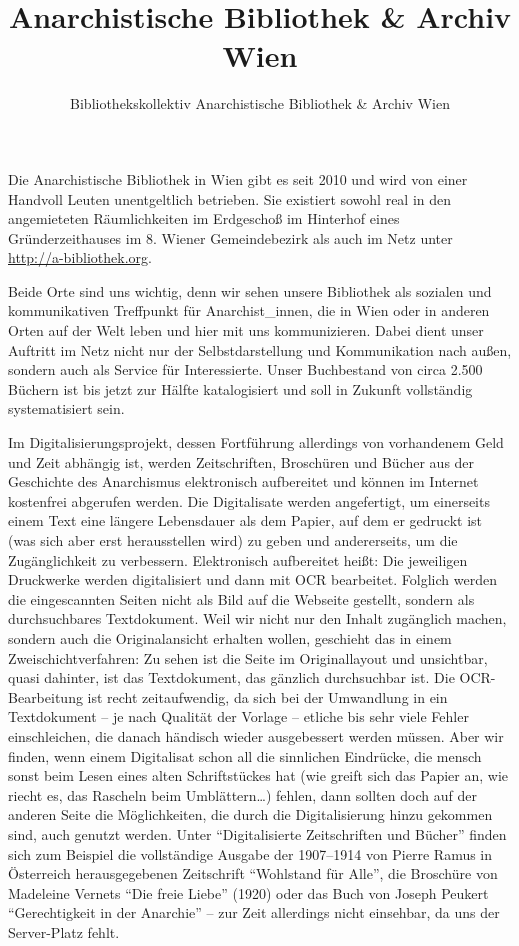 \documentclass[a4paper,
fontsize=11pt,
oneside,
numbers=noperiodatend,
parskip=half-,
bibliography=totoc,
final
]{scrartcl}
\title{\LARGE{Anarchistische Bibliothek \& Archiv Wien}} %
\author{Bibliothekskollektiv Anarchistische Bibliothek \& Archiv Wien} %
\date{}
\begin{document}
\maketitle
\thispagestyle{fancyplain} 


Die Anarchistische Bibliothek in Wien gibt es seit 2010 und wird von
einer Handvoll Leuten unentgeltlich betrieben. Sie existiert sowohl real
in den angemieteten Räumlichkeiten im Erdgeschoß im Hinterhof eines
Gründerzeithauses im 8. Wiener Gemeindebezirk als auch im Netz unter
\url{http://a-bibliothek.org}.

Beide Orte sind uns wichtig, denn wir sehen unsere Bibliothek als
sozialen und kommunikativen Treffpunkt für Anarchist\_innen, die in Wien
oder in anderen Orten auf der Welt leben und hier mit uns kommunizieren.
Dabei dient unser Auftritt im Netz nicht nur der Selbstdarstellung und
Kommunikation nach außen, sondern auch als Service für Interessierte.
Unser Buchbestand von circa 2.500 Büchern ist bis jetzt zur Hälfte
katalogisiert und soll in Zukunft vollständig systematisiert sein.

Im Digitalisierungsprojekt, dessen Fortführung allerdings von
vorhandenem Geld und Zeit abhängig ist, werden Zeitschriften, Broschüren
und Bücher aus der Geschichte des Anarchismus elektronisch aufbereitet
und können im Internet kostenfrei abgerufen werden. Die Digitalisate
werden angefertigt, um einerseits einem Text eine längere Lebensdauer
als dem Papier, auf dem er gedruckt ist (was sich aber erst
herausstellen wird) zu geben und andererseits, um die Zugänglichkeit zu
verbessern. Elektronisch aufbereitet heißt: Die jeweiligen Druckwerke
werden digitalisiert und dann mit OCR bearbeitet. Folglich werden die
eingescannten Seiten nicht als Bild auf die Webseite gestellt, sondern
als durchsuchbares Textdokument. Weil wir nicht nur den Inhalt
zugänglich machen, sondern auch die Originalansicht erhalten wollen,
geschieht das in einem Zweischichtverfahren: Zu sehen ist die Seite im
Originallayout und unsichtbar, quasi dahinter, ist das Textdokument, das
gänzlich durchsuchbar ist. Die OCR-Bearbeitung ist recht zeitaufwendig,
da sich bei der Umwandlung in ein Textdokument -- je nach Qualität der
Vorlage -- etliche bis sehr viele Fehler einschleichen, die danach
händisch wieder ausgebessert werden müssen. Aber wir finden, wenn einem
Digitalisat schon all die sinnlichen Eindrücke, die mensch sonst beim
Lesen eines alten Schriftstückes hat (wie greift sich das Papier an, wie
riecht es, das Rascheln beim Umblättern\ldots{}) fehlen, dann sollten
doch auf der anderen Seite die Möglichkeiten, die durch die
Digitalisierung hinzu gekommen sind, auch genutzt werden. Unter
\enquote{Digitalisierte Zeitschriften und Bücher} finden sich zum
Beispiel die vollständige Ausgabe der 1907--1914 von Pierre Ramus in
Österreich herausgegebenen Zeitschrift \enquote{Wohlstand für Alle}, die
Broschüre von Madeleine Vernets \enquote{Die freie Liebe} (1920) oder
das Buch von Joseph Peukert \enquote{Gerechtigkeit in der Anarchie} --
zur Zeit allerdings nicht einsehbar, da uns der Server-Platz fehlt.
\end{document}
